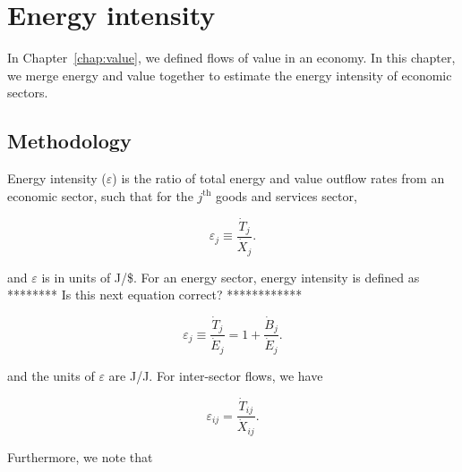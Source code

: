 %
%
%
\chapter{Energy intensity}
\label{chap:intensity} %

In Chapter~\ref{chap:value}, we defined flows of value in an economy.
In this chapter, we merge energy and value together to estimate
the energy intensity of economic sectors.


\section{Methodology}

Energy intensity ($\varepsilon$) is the ratio 
of total energy and value outflow rates from an economic sector, 
such that for the $j^{\mathrm{th}}$ goods and services sector,

\begin{equation} \label{eq:epsilon_output_def_g_and_s}
	\varepsilon_{j} \equiv \frac{\dot{T}_{j}}{\dot{X}_{j}}.
\end{equation}

\noindent and $\varepsilon$ is in units of J/\$. 
For an energy sector, energy intensity is defined as
******** Is this next equation correct? ************

\begin{equation} \label{eq:epsilon_output_def_energy}
	\varepsilon_{j} \equiv \frac{\dot{T}_{j}}{\dot{E}_{j}} 
	= 1 + \frac{\dot{B}_{j}}{\dot{E}_{j}}.
\end{equation}

\noindent and the units of $\varepsilon$ are J/J. 
For inter-sector flows, we have

\begin{equation} \label{eq:epsilon_transfers_1}
	\varepsilon_{ij} = \frac{\dot{T}_{ij}}{\dot{X}_{ij}}.
\end{equation}

Furthermore, we note that 

